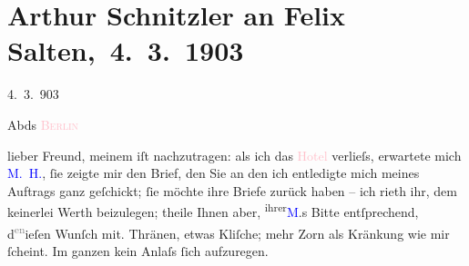 

\renewcommand{\erwaehntePersonen}{Personen: Otto Brahm, Mirjam Horwitz, Adolf Landesmann, Felix Salten}
\renewcommand{\erwaehnteOrte}{Orte: Berlin, Palasthotel Berlin, Wien}
\renewcommand{\erwaehnteWerke}{Werke: Die Gespräche des göttlichen Pietro Aretino, Vom göttlichen Aretino}
\section[ Arthur Schnitzler an Felix Salten, 4. 3. 1903]{Arthur Schnitzler an Felix Salten, 4. 3. 1903}
\nopagebreak{}
\rehead{ }\normalsize\beginnumbering{}
\toendnotes[C]{\smallbreak\pagebreak[2]}
\toendnotes[C]{\smallbreak}
\pstart
           \raggedleft{}{\pb}4. 3. 903\pend
           
\pstart
           \raggedleft{}Abds{ }\textsc{\textcolor{pink}{Berlin}{}\ledrightnote{\textcolor{pink}{Berlin}}}\pend
           
\pstart
           lieber Freund, meinem \label{K_L02981-1v}\label{K_L02981-1h} iſt nachzutragen: als ich das \textcolor{pink}{Hotel}{}\ledrightnote{{$\rightarrow$}\textcolor{pink}{Palasthotel Berlin}} verlieſs, erwartete mich \textcolor{blue}{M. H.}{}\ledrightnote{\textcolor{blue}{Mirjam Horwitz}},
               ſie zeigte mir den Brief, den Sie an den \label{K_L02981-2v}\label{K_L02981-2h}{\dotstwo} ich entledigte mich meines Auftrags ganz geſchickt; ſie
                  {\pb}möchte ihre Briefe zurück haben – ich
               rieth ihr, dem keinerlei Werth beizulegen; theile Ihnen aber, \substVorne{}\textsuperscript{ihrer}\substDazwischen{}\textcolor{blue}{M}{}\ledrightnote{\textcolor{blue}{Mirjam Horwitz}}.s
               \substHinten{} Bitte entſprechend, d\substVorne{}\textsuperscript{\textcolor{gray}{en}}\substDazwischen{}ie\substHinten{}ſen Wunſch mit. Thränen, etwas Kliſche; mehr Zorn als Kränkung wie mir
               ſcheint. Im ganzen kein Anlaſs ſich aufzuregen.\pend
           
